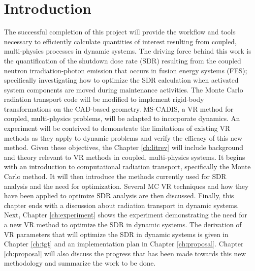 
\chapter{Introduction} \label{ch:intro}

The successful completion of this project will provide the workflow and tools
necessary to efficiently calculate quantities of interest resulting from
coupled, multi-physics processes in dynamic systems.  
The driving force behind this work is the quantification of the shutdown dose rate
(SDR) resulting from the coupled neutron
irradiation-photon emission that occurs in fusion energy systems (FES);
specifically investigating how to optimize the SDR calculation when%
activated system components are moved during maintenance activities.
The Monte Carlo radiation transport code will
be modified to implement rigid-body transformations on the CAD-based geometry.
MS-CADIS, a VR method for coupled, multi-physics problems, will be adapted to
incorporate dynamics.  An experiment will be contrived to demonstrate the
limitations of existing VR methods as they apply to dynamic problems and verify
the efficacy of this new method.  Given these objectives, the Chapter \ref{ch:litrev}
will include background and theory relevant to VR methods in coupled,
multi-physics systems.  It begins with an introduction to computational
radiation transport, specifically the Monte Carlo method.
It will then introduce the methods currently used for SDR analysis and the
need for optimization.  Several MC VR techniques and how they have been applied
 to optimize SDR analysis are then discussed.
Finally, this chapter ends with a discussion about radiation transport in
dynamic systems.  
Next, Chapter \ref{ch:experiment} shows the experiment demonstrating the need
for a new VR method to optimize the SDR in dynamic systems.  The derivation of
VR parameters that will optimize the SDR in dynamic systems is given in
Chapter \ref{ch:tgt} and an implementation plan in Chapter \ref{ch:proposal}.
Chapter \ref{ch:proposal} will also discuss
the progress that has been made towards this new methodology and summarize the
work to be done.

